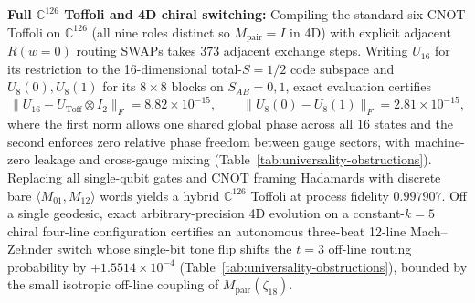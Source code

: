 \textbf{Full $\mathbb{C}^{126}$ Toffoli and 4D chiral switching:} Compiling the standard six-CNOT Toffoli on
$\mathbb{C}^{126}$ (all nine roles distinct so $M_{\mathrm{pair}} = I$ in 4D) with explicit adjacent $R(w = 0)$ routing
SWAPs takes $373$ adjacent exchange steps. Writing $U_{16}$ for its restriction to the 16-dimensional total-$S = 1/2$
code subspace and $U_8(0), U_8(1)$ for its $8 \times 8$ blocks on $S_{AB} = 0, 1$, exact evaluation certifies
\begin{equation}
\|U_{16} - U_{\mathrm{Toff}} \otimes I_2\|_F = 8.82 \times 10^{-15},
\qquad
\|U_8(0) - U_8(1)\|_F = 2.81 \times 10^{-15},
\label{eq:toffoli-cert}
\end{equation}
where the first norm allows one shared global phase across all $16$ states and the second enforces zero relative phase
freedom between gauge sectors, with machine-zero leakage and cross-gauge mixing
(Table~\ref{tab:universality-obstructions}). Replacing all single-qubit gates and CNOT framing Hadamards with discrete
bare $\langle M_{01}, M_{12}\rangle$ words yields a hybrid $\mathbb{C}^{126}$ Toffoli at process fidelity $0.997907$.
Off a single geodesic, exact arbitrary-precision 4D evolution on a constant-$k = 5$ chiral four-line configuration
certifies an autonomous three-beat 12-line Mach--Zehnder switch whose single-bit tone flip shifts the $t = 3$ off-line
routing probability by $+1.5514 \times 10^{-4}$ (Table~\ref{tab:universality-obstructions}), bounded by the small
isotropic off-line coupling of $M_{\mathrm{pair}}(\zeta_{18})$.

